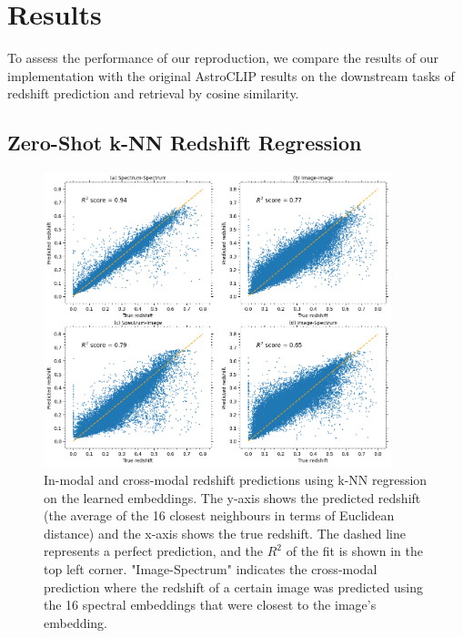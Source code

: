 
\section{Results}\label{sec:results}
To assess the performance of our reproduction, we compare the results of our implementation with the original AstroCLIP
results on the downstream tasks of redshift prediction and retrieval by cosine similarity.

\subsection{Zero-Shot k-NN Redshift Regression}\label{subsec:results-redshift-regression}
\begin{figure}[htb]
    \centering
    \includegraphics[width=0.9\textwidth]{figures/redshift_knn_regression}
    \caption{In-modal and cross-modal redshift predictions using k-NN regression on the learned embeddings. The y-axis shows
    the predicted redshift (the average of the 16 closest neighbours in terms of Euclidean distance) and the x-axis shows the true redshift.
    The dashed line represents a perfect prediction, and the $R^{2}$ of the fit is shown in the top left corner.
    "Image-Spectrum" indicates the cross-modal prediction where the redshift of a certain image was predicted using the
    16 spectral embeddings that were closest to the image's embedding.}
    \label{fig:rkr}
\end{figure}
